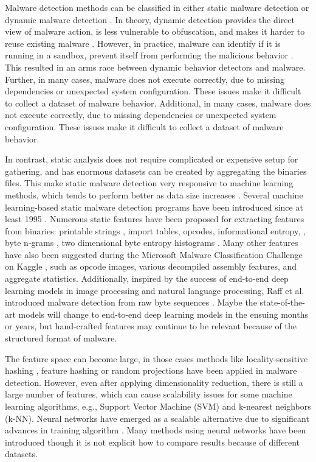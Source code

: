 Malware detection methods can be classified in either static malware detection or dynamic malware detection \cite{egele2012survey}.
In theory, dynamic detection provides the direct view of malware action, is less vulnerable to obfuscation, and makes it harder to reuse existing malware \cite{moser2007limits}.
However, in practice, malware can identify if it is running in a sandbox, prevent itself from performing the malicious behavior \cite{vidas2014evading}.
This resulted in an arms race between dynamic behavior detectors and malware.
Further, in many cases, malware does not execute correctly, due to missing dependencies or unexpected system configuration.
These issues make it difficult to collect a dataset of malware behavior.
Additional, in many cases, malware does not execute correctly, due to missing dependencies or unexpected system configuration.
These issues make it difficult to collect a dataset of malware behavior.

In contrast, static analysis does not require complicated or expensive setup for gathering, and has enormous datasets can be created by aggregating the binaries files.
This make static malware detection very responsive to machine learning methods, which tends to perform better as data size increases \cite{banko2001scaling}.
Several machine learning-based static malware detection programs have been introduced since at least 1995 \cite{kephart1995biologically,schultz2001data,kolter2006learning,Shafiq2009AFF,saxe2015deep}.
Numerous static features have been proposed for extracting  features  from  binaries:  printable  strings \cite{schultz2001data}, import tables, opcodes, informational entropy, \cite{weber2002toolkit}, byte n-grams \cite{abou2004n}, two dimensional byte entropy histograms \cite{saxe2015deep}.
Many other features have also been suggested during the Microsoft Malware Classification Challenge on Kaggle \cite{ronen2018microsoft}, such as opcode images, various decompiled assembly features, and aggregate statistics.
Additionally, inspired by the success of end-to-end deep learning models in image processing and natural language processing, Raff et al. introduced malware detection from raw byte sequences \cite{raff2017malware}.
Maybe the state-of-the-art models will change to end-to-end deep learning models in the ensuing months or years, but hand-crafted features may continue to be relevant because of the structured format of malware.

The feature space can become large, in those cases methods like locality-sensitive hashing \cite{bayer2009scalable}, feature hashing \cite{jang2011bitshred} or random projections \cite{fradkin2003experiments} have been applied in malware detection.
However, even after applying dimensionality reduction, there is still a large number of features, which can cause scalability issues for some machine learning algorithms, e.g., Support Vector Machine (SVM) and k-nearest neighbors (k-NN). 
Neural networks have emerged as a scalable alternative due to significant advances in training algorithm \cite{almasi2016review}.
Many methods using neural networks have been introduced \cite{saxe2015deep, dahl2013large, kephart1995biologically, benchea2014combining} though it is not explicit how to compare results because of different datasets.


